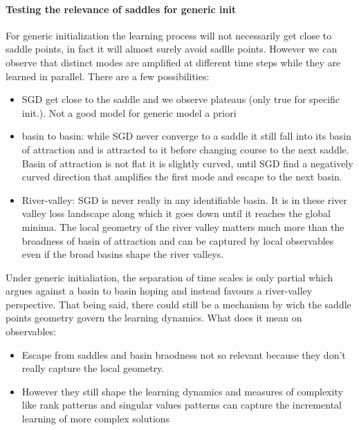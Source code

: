 \documentclass{article}
\theoremstyle{definition}
\begin{document}
\paragraph{Testing the relevance of saddles for generic init}
For generic initialization the learning process will not necessarily get close to saddle points, in fact it will almost surely avoid sadlle points. However we can observe that distinct modes are amplified at different time steps while they are learned in parallel. There are a few possibilities:
\begin{itemize}
    \item SGD get close to the saddle and we observe plateaus (only true for specific init.). Not a good model for generic model a priori
    \item basin to basin: while SGD never converge to a saddle it still fall into its basin of attraction and is attracted to it before changing course to the next saddle. Basin of attraction is not flat it is slightly curved, until SGD find a negatively curved direction that amplifies the first mode and escape to the next basin. 
    \item River-valley: SGD is never really in any identifiable basin. It is in these river valley loss landscape along which it goes down until it reaches the global minima. The local geometry of the river valley matters much more than the broadness of basin of attraction and can be captured by local observables even if the broad basins shape the river valleys. 
\end{itemize} 
Under generic initialiation, the separation of time scales is only partial which argues against a basin to basin hoping and instead favours a river-valley perspective. That being said, there could still be a mechanism by wich the saddle points geometry govern the learning dynamics. What does it mean on observables:
\begin{itemize}
    \item Escape from saddles and basin braodness not so relevant because they don't really capture the local geometry.
    \item However they still shape the learning dynamics and measures of complexity like rank patterns and singular values patterns can capture the incremental learning of more complex solutions
\end{itemize}
\end{document}

